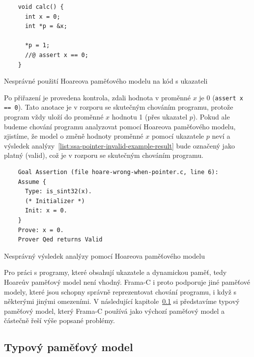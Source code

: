 \begin{listing}[H]
    \begin{verbatim}
    void calc() {
      int x = 0;
      int *p = &x;

      *p = 1;
      //@ assert x == 0;
    }
    \end{verbatim}
    \caption{Nesprávné použití Hoareova paměťového modelu na kód s ukazateli}
    \label{list:ssa-pointer-invalid-example}
\end{listing}

Po přiřazení je provedena kontrola, zdali hodnota v proměnné $x$ je 0 (\texttt{assert x == 0}).
Tato anotace je v rozporu se skutečným chováním programu,
protože program vždy uloží do proměnné $x$ hodnotu 1 (přes ukazatel $p$).
Pokud ale budeme chování programu analyzovat pomocí Hoareova paměťového modelu,
zjistíme, že model o změně hodnoty proměnné $x$ pomocí ukazatele $p$ neví
a výsledek analýzy~\ref{list:ssa-pointer-invalid-example-result} bude označený jako platný (valid),
což je v rozporu se skutečným chováním programu.

\begin{listing}[H]
    \begin{verbatim}
    Goal Assertion (file hoare-wrong-when-pointer.c, line 6):
    Assume {
      Type: is_sint32(x).
      (* Initializer *)
      Init: x = 0.
    }
    Prove: x = 0.
    Prover Qed returns Valid
    \end{verbatim}
    \caption{Nesprávný výsledek analýzy pomocí Hoareova paměťového modelu}
    \label{list:ssa-pointer-invalid-example-result}
\end{listing}

Pro práci s programy, které obsahují ukazatele a dynamickou paměť, tedy Hoareův paměťový model není vhodný.
Frama\mbox{-}C i proto podporuje jiné paměťové modely,
které jsou schopny správně reprezentovat chování programu, i když s některými jinými omezeními.
V následující kapitole~\ref{subsec:typovy-pametovy-model} si představíme typový paměťový model,
který Frama\mbox{-}C používá jako výchozí paměťový model a částečně řeší výše popsané problémy.

\subsection{Typový paměťový model}
\label{subsec:typovy-pametovy-model}


